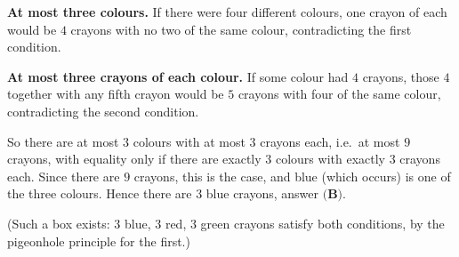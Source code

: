\textbf{At most three colours.} If there were four different colours, one crayon of each would be $4$ crayons with no two of the same colour, contradicting the first condition.

\textbf{At most three crayons of each colour.} If some colour had $4$ crayons, those $4$ together with any fifth crayon would be $5$ crayons with four of the same colour, contradicting the second condition.

So there are at most $3$ colours with at most $3$ crayons each, i.e.\ at most $9$ crayons, with equality only if there are exactly $3$ colours with exactly $3$ crayons each. Since there are $9$ crayons, this is the case, and blue (which occurs) is one of the three colours. Hence there are $\boxed{3}$ blue crayons, answer $\textbf{(B)}$.

(Such a box exists: $3$ blue, $3$ red, $3$ green crayons satisfy both conditions, by the pigeonhole principle for the first.)
